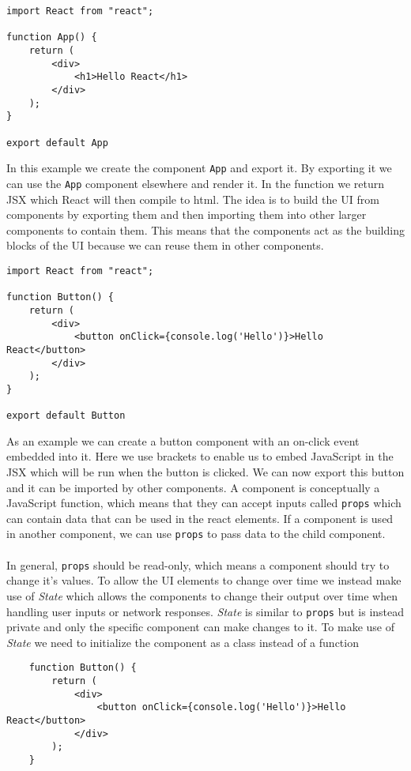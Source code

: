 \begin{lstlisting}
import React from "react";
    
function App() {
    return (
        <div>
            <h1>Hello React</h1>
        </div>
    );
}

export default App
\end{lstlisting}
In this example we create the component \texttt{App} and export it. 
By exporting it we can use the \texttt{App} component elsewhere and render it. 
In the function we return JSX which React will then compile to html.
The idea is to build the UI from components by exporting them and then importing them into other larger components to contain them.
This means that the components act as the building blocks of the UI because we can reuse them in other components.
\begin{lstlisting}
import React from "react";
        
function Button() {
    return (
        <div>
            <button onClick={console.log('Hello')}>Hello React</button>
        </div>
    );
}
    
export default Button
\end{lstlisting}
As an example we can create a button component with an on-click event embedded into it. 
Here we use brackets to enable us to embed JavaScript in the JSX which will be run when the button is clicked.
We can now export this button and it can be imported by other components. 
A component is conceptually a JavaScript function, which means that they can accept inputs called \texttt{props} which can contain data that can be used in the react elements. If a component is used in another component, we can use \texttt{props} to pass data to the child component.
\\\\
In general, \texttt{props} should be read-only, which means a component should try to change it's values. 
To allow the UI elements to change over time we instead make use of \textit{State} which allows the components to change their output over time when handling user inputs or network responses. 
\textit{State}  is similar to \texttt{props} but is instead private and only the specific component can make changes to it. To make use of \textit{State} we need to initialize the component as a class instead of a function
\begin{lstlisting}
    function Button() {
        return (
            <div>
                <button onClick={console.log('Hello')}>Hello React</button>
            </div>
        );
    }
\end{lstlisting}
